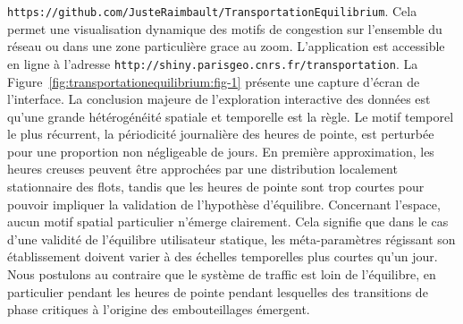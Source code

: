 {{\texttt{https://github.com/JusteRaimbault/TransportationEquilibrium}}.
Cela permet une visualisation dynamique des motifs de congestion sur l'ensemble du réseau ou dans une zone particulière grace au zoom. L'application est accessible en ligne à l'adresse \texttt{http://shiny.parisgeo.cnrs.fr/transportation}. La Figure~\ref{fig:transportationequilibrium:fig-1} présente une capture d'écran de l'interface. La conclusion majeure de l'exploration interactive des données est qu'une grande hétérogénéité spatiale et temporelle est la règle. Le motif temporel le plus récurrent, la périodicité journalière des heures de pointe, est perturbée pour une proportion non négligeable de jours. En première approximation, les heures creuses peuvent être approchées par une distribution localement stationnaire des flots, tandis que les heures de pointe sont trop courtes pour pouvoir impliquer la validation de l'hypothèse d'équilibre. Concernant l'espace, aucun motif spatial particulier n'émerge clairement. Cela signifie que dans le cas d'une validité de l'équilibre utilisateur statique, les méta-paramètres régissant son établissement doivent varier à des échelles temporelles plus courtes qu'un jour. Nous postulons au contraire que le système de traffic est loin de l'équilibre, en particulier pendant les heures de pointe pendant lesquelles des transitions de phase critiques à l'origine des embouteillages émergent.
}
 


